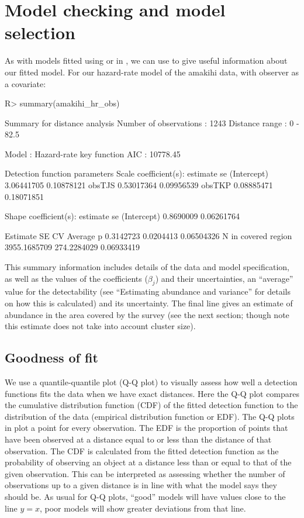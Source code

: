 \documentclass[article]{jss}\usepackage[]{graphicx}\usepackage[]{color}
\begin{document}
\section{Model checking and model selection}

As with models fitted using  or  in , we can use  to give useful information about our fitted model. For our hazard-rate model of the amakihi data, with observer as a covariate:
\begin{Schunk}
\begin{Sinput}
R> summary(amakihi_hr_obs)
\end{Sinput}
\begin{Soutput}

Summary for distance analysis 
Number of observations :  1243 
Distance range         :  0  -  82.5 

Model : Hazard-rate key function 
AIC   : 10778.45 

Detection function parameters
Scale coefficient(s):  
              estimate         se
(Intercept) 3.06441705 0.10878121
obsTJS      0.53017364 0.09956539
obsTKP      0.08885471 0.18071851

Shape coefficient(s):  
             estimate         se
(Intercept) 0.8690009 0.06261764

                        Estimate          SE         CV
Average p              0.3142723   0.0204413 0.06504326
N in covered region 3955.1685709 274.2284029 0.06933419
\end{Soutput}
\end{Schunk}
This summary information includes details of the data and model specification, as well as the values of the coefficients ($\beta_j$) and their uncertainties, an ``average'' value for the detectability (see ``Estimating abundance and variance'' for details on how this is calculated) and its uncertainty. The final line gives an estimate of abundance in the area covered by the survey (see the next section; though note this estimate does not take into account cluster size).


\subsection{Goodness of fit}

We use a quantile-quantile plot (Q-Q plot) to visually assess how well a detection functions fits the data when we have exact distances. Here the Q-Q plot compares the cumulative distribution function (CDF) of the fitted detection function to the distribution of the data (empirical distribution function or EDF). The Q-Q plots in  plot a point for every observation. The EDF is the proportion of points that have been observed at a distance equal to or less than the distance of that observation. The CDF is calculated from the fitted detection function as the probability of observing an object at a distance less than or equal to that of the given observation. This can be interpreted as assessing whether the number of observations up to a given distance is in line with what the model says they should be. As usual for Q-Q plots, ``good'' models will have values close to the line $y=x$, poor models will show greater deviations from that line.
\end{document}
